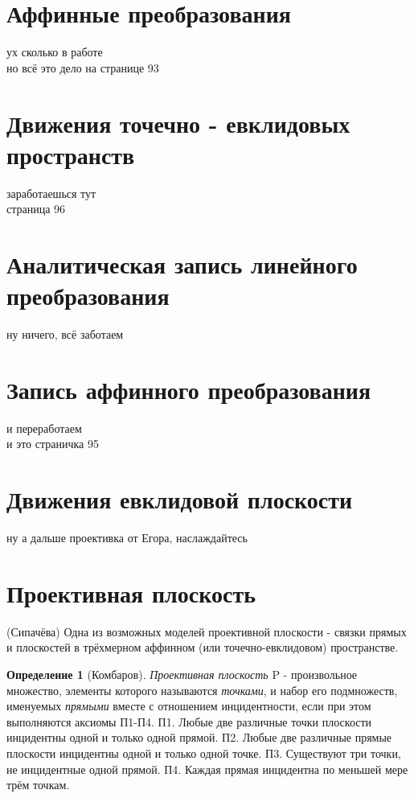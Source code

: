 \documentclass[a4paper, 12pt]{article}
\theoremstyle{definition}
\newtheorem*{definition}{Определение}
\begin{document}
\section{Аффинные преобразования}
ух сколько в работе\\
но всё это дело на странице 93

\section{Движения точечно - евклидовых пространств}
заработаешься тут\\
страница 96

\section{Аналитическая запись линейного преобразования}
ну ничего, всё заботаем

\section{Запись аффинного преобразования}
и переработаем\\
и это страничка 95

\section{Движения евклидовой плоскости}
ну а дальше проективка от Егора, наслаждайтесь

\section{Проективная плоскость}
(Сипачёва) Одна из возможных моделей проективной плоскости - связки прямых и плоскостей в трёхмерном аффинном (или точечно-евклидовом) пространстве.
\begin{definition}[Комбаров]
    \textit{Проективная плоскость} P - произвольное множество, элементы которого называются \textit{точками}, и набор его подмножеств, именуемых \textit{прямыми} вместе с отношением инцидентности, если при этом выполняются аксиомы П1-П4. \newline
    П1. Любые две различные точки плоскости инцидентны одной и только одной прямой. \newline
    П2. Любые две различные прямые плоскости инцидентны одной и только одной точке. \newline
    П3. Существуют три точки, не инцидентные одной прямой. \newline
    П4. Каждая прямая инцидентна по меньшей мере трём точкам.
\end{definition}
\end{document}
